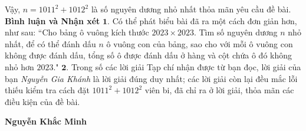 \begin{multicols}{2}
	\vskip 0.05cm
	Vậy, $n = 1011^2 + 1012^2$ là số nguyên dương nhỏ nhất thỏa mãn yêu cầu đề bài.
	\vskip 0.05cm
	\textbf{\color{thachthuctoanhoc}Bình luận và Nhận xét}
	\vskip 0.05cm
	$\pmb{1.}$ Có thể phát biểu bài đã ra một cách đơn giản hơn, như sau:
	\vskip 0.05cm
	``Cho bảng ô vuông kích thước $2023 \times 2023$. Tìm số nguyên dương $n$ nhỏ nhất, để có thể đánh dấu $n$ ô vuông con của bảng, sao cho với mỗi ô vuông con không được đánh dấu, tổng số ô được đánh dấu ở hàng và cột chứa ô đó không nhỏ hơn $2023$."
	\vskip 0.05cm
	$\pmb{2.}$ Trong số các lời giải Tạp chí nhận được từ bạn đọc, lời giải của bạn \textit{Nguyễn Gia Khánh} là lời giải đúng duy nhất; các lời giải còn lại đều mắc lỗi thiếu kiểm tra cách đặt $1011^2 + 1012^2$ viên bi, đã chỉ ra ở lời giải, thỏa mãn các điều kiện của đề bài.
	\begin{flushright}
		\textbf{\color{thachthuctoanhoc}Nguyễn Khắc Minh}
	\end{flushright}
\end{multicols}
